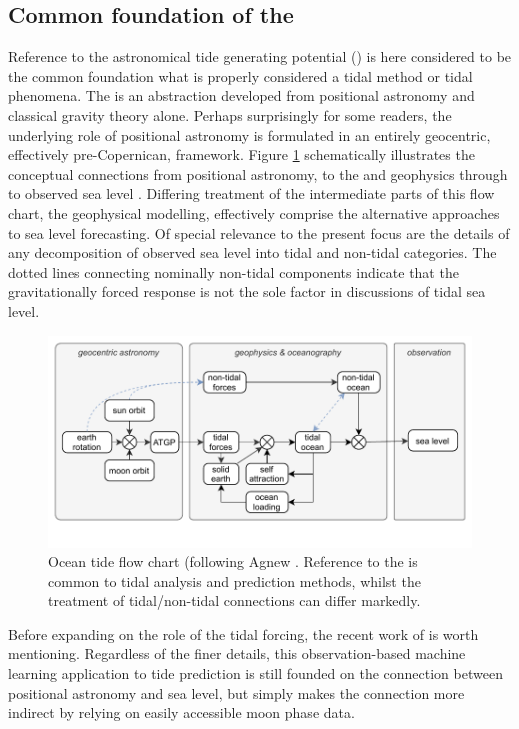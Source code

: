 \subsection{Common foundation of the \ATGP{}}
Reference to the astronomical tide generating potential (\ATGP{}) is here considered to be the common foundation what is properly considered a tidal method or tidal phenomena.  
The \ATGP{} is an abstraction developed from positional astronomy and classical gravity theory alone.   Perhaps surprisingly for some readers, the underlying role of positional astronomy is formulated in an entirely geocentric, effectively pre-Copernican, framework. 
Figure \ref{fig:tideForceFlow} schematically illustrates the conceptual connections from positional astronomy, to the \ATGP{} and geophysics through to observed sea level .  
Differing treatment of the intermediate parts of this flow chart, the geophysical modelling, effectively comprise the alternative approaches to sea level forecasting.  Of special relevance to the present focus are the details of any decomposition of observed sea level into tidal and non-tidal categories.   The dotted lines connecting nominally non-tidal components indicate that the gravitationally forced response is not the sole factor in discussions of tidal sea level. 
\begin{figure}[h]
    \begin{center}
    \includegraphics[width=\figwidthFull]{figures/diagrams/tidal_force_flowchart.pdf}
    \caption{Ocean tide flow chart (following Agnew \citep{Agnew:2011ub}.  Reference to the \ATGP{} is common to tidal analysis and prediction methods, whilst the treatment of tidal/non-tidal connections can differ markedly.}
    \label{fig:tideForceFlow}
    \end{center}
\end{figure}
Before expanding on the role of the tidal forcing, the recent work of \cite{10.1016/j.oceaneng.2020.107013} is worth mentioning.   Regardless of the finer details, this observation-based machine learning application to tide prediction is still founded on the connection between positional astronomy and sea level, but simply makes the connection more indirect by relying on easily accessible moon phase data.
